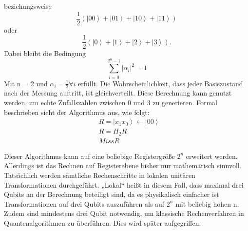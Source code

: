 beziehungsweise $$\frac{1}{2}\left(\left|\left.00\right\rangle\right.+\left|\left.01\right\rangle\right.+\left|\left.10\right\rangle\right.+\left|\left.11\right\rangle\right.\right)$$ oder $$\frac{1}{2}\left(\left|\left.0\right\rangle\right.+\left|\left.1\right\rangle\right.+\left|\left.2\right\rangle\right.+\left|\left.3\right\rangle\right.\right).$$
Dabei bleibt die Bedingung 
$$\sum_{i=0}^{2^n-1}\left|\alpha_i\right|^2=1$$
 Mit n = 2 und $\alpha_i=\frac{1}{2}\forall i$ erfüllt. Die Wahrscheinlichkeit, dass jeder Basiszustand nach der Messung auftritt, ist gleichverteilt. Diese Berechnung kann genutzt werden, um echte Zufallszahlen zwischen 0 und 3 zu generieren. Formal beschrieben sieht der Algorithmus aus, wie folgt:
 \begin{align*}
     &R=\left|\left.x_1x_0\right\rangle\right.\gets\left|\left.00\right\rangle\right.\\
	&R=H_2R\\
	&Miss R
 \end{align*}

Dieser Algorithmus kann auf eine beliebige Registergröße $2^n$ erweitert werden. 
Allerdings ist das Rechnen auf Registerebene bisher nur mathematisch sinnvoll. Tatsächlich werden sämtliche Rechenschritte in lokalen unitären Transformationen durchgeführt. „Lokal“ heißt in diesem Fall, dass maximal drei Qubits an der Berechnung beteiligt sind, da es physikalisch einfacher ist Transformationen auf drei Qubits auszuführen als auf $2^n$ mit beliebig hohen n. Zudem sind mindestens drei Qubit notwendig, um klassische Rechenverfahren in Quantenalgorithmen zu überführen. Dies wird später aufgegriffen.\\

